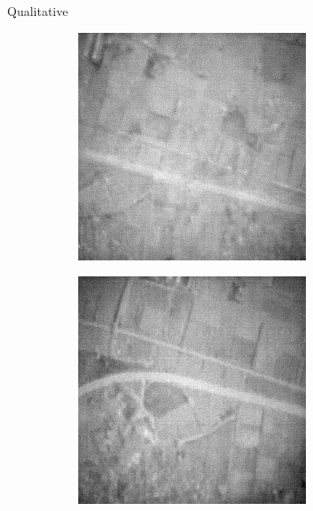 \begin{frame}{Qualitative}
\begin{figure}
\begin{subfigure}[b]{0.185\textwidth}
        \end{subfigure}
        \hspace{0.05em}%
        \begin{subfigure}[b]{0.185\textwidth}
            \centering
            \includegraphics[width=\textwidth]{../figs/outputs/petit/71.png}
        \end{subfigure}
        \hspace{0.05em}%
        \begin{subfigure}[b]{0.185\textwidth}
            \centering
            \includegraphics[width=\textwidth]{../figs/outputs/mono/605.png}
        \end{subfigure}      
                

\end{figure}
\end{frame}
